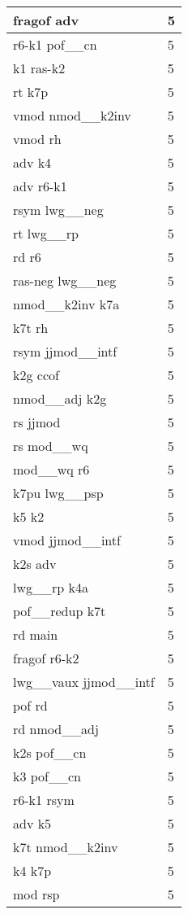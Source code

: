 \documentclass[a4 paper]{article}
\begin{document}
\begin{longtable}{p{}p{}}
fragof adv  & 5 \\ \midrule
r6-k1 pof\_\_cn  & 5 \\ \midrule
k1 ras-k2  & 5 \\ \midrule
rt k7p  & 5 \\ \midrule
vmod nmod\_\_k2inv  & 5 \\ \midrule
vmod rh  & 5 \\ \midrule
adv k4  & 5 \\ \midrule
adv r6-k1  & 5 \\ \midrule
rsym lwg\_\_neg  & 5 \\ \midrule
rt lwg\_\_rp  & 5 \\ \midrule
rd r6  & 5 \\ \midrule
ras-neg lwg\_\_neg  & 5 \\ \midrule
nmod\_\_k2inv k7a  & 5 \\ \midrule
k7t rh  & 5 \\ \midrule
rsym jjmod\_\_intf  & 5 \\ \midrule
k2g ccof  & 5 \\ \midrule
nmod\_\_adj k2g  & 5 \\ \midrule
rs jjmod  & 5 \\ \midrule
rs mod\_\_wq  & 5 \\ \midrule
mod\_\_wq r6  & 5 \\ \midrule
k7pu lwg\_\_psp  & 5 \\ \midrule
k5 k2  & 5 \\ \midrule
vmod jjmod\_\_intf  & 5 \\ \midrule
k2s adv  & 5 \\ \midrule
lwg\_\_rp k4a  & 5 \\ \midrule
pof\_\_redup k7t  & 5 \\ \midrule
rd main  & 5 \\ \midrule
fragof r6-k2  & 5 \\ \midrule
lwg\_\_vaux jjmod\_\_intf  & 5 \\ \midrule
pof rd  & 5 \\ \midrule
rd nmod\_\_adj  & 5 \\ \midrule
k2s pof\_\_cn  & 5 \\ \midrule
k3 pof\_\_cn  & 5 \\ \midrule
r6-k1 rsym  & 5 \\ \midrule
adv k5  & 5 \\ \midrule
k7t nmod\_\_k2inv  & 5 \\ \midrule
k4 k7p  & 5 \\ \midrule
mod rsp  & 5 \\ \midrule

\end{longtable}
\end{document}
